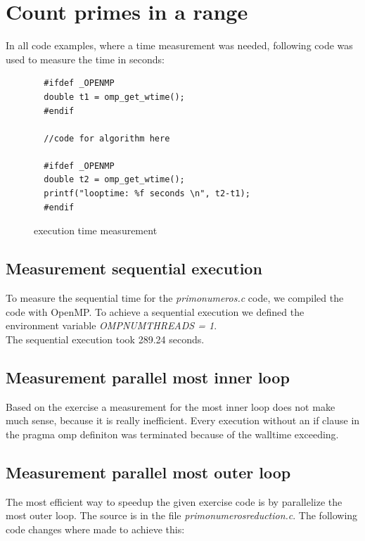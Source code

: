 \documentclass[11pt,a4paper]{article}
\begin{document}
\section{Count primes in a range}

In all code examples, where a time measurement was needed, following code was used to measure the time in seconds:
 
\begin{figure}[h]
\label{code_timemeasurement}
\begin{lstlisting}
  #ifdef _OPENMP
  double t1 = omp_get_wtime();
  #endif  
  
  //code for algorithm here
  
  #ifdef _OPENMP
  double t2 = omp_get_wtime();
  printf("looptime: %f seconds \n", t2-t1);
  #endif
\end{lstlisting} 
\caption{execution time measurement}
\end{figure} 
 

\subsection{Measurement sequential execution}

To measure the sequential time for the 
\textit{primo\textunderscore numeros\textunderscore .c} code, we compiled the code with OpenMP. To achieve a sequential execution we defined the environment variable
\textit{OMP\textunderscore NUM\textunderscore THREADS = 1}. \\
The sequential execution took 289.24 seconds.


\subsection{Measurement parallel most inner loop}

Based on the exercise a measurement for the most inner loop does not make much sense, because it is really inefficient. Every execution without an if clause in the pragma omp definiton was terminated because of the walltime exceeding.

\pagebreak

\subsection{Measurement parallel most outer loop}

The most efficient way to speedup the given exercise code is by parallelize the most outer loop. 
The source is in the file \textit{primo\textunderscore numeros\textunderscore reduction.c}.
The following code changes where made to achieve this:
\end{document}
